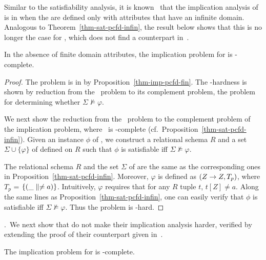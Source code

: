 Similar to the satisfiability analysis,
it is known~\cite{CFDs} that the implication analysis of
\CFDs is in \PTIME when the \CFDs are defined only with attributes that
have an infinite domain. Analogous to Theorem~\ref{thm-sat-pcfd-infin},
the result below shows that this is no longer the case for \pCFDs,
which does not find a counterpart in~\cite{CFDs}.

\begin{prop}
\label{thm-imp-pcfd-infin} In the absence of finite domain
attributes, the implication problem for \pCFDs is
\coNP-complete.
\end{prop}


\begin{proof}
The problem is in \coNP by
Proposition~\ref{thm-imp-pcfd-fin}. The \coNP-hardness is shown
by reduction from the \kSAT\ problem to its complement problem, \ie
the problem for determining whether $\Sigma\not\models\varphi$.


We next show the reduction from the \kSAT\ problem to the complement
problem of the implication problem, where \kSAT\ is \NP-complete
(cf.~Proposition~\ref{thm-sat-pcfd-infin}). Given an instance $\phi$
of \kSAT, we construct a relational schema $R$ and a set
$\Sigma\cup\{\varphi\}$ of \pCFDs defined on $R$ such that $\phi$
is satisfiable iff $\Sigma\not\models\varphi$.


The relational schema $R$ and the set $\Sigma$ of \pCFDs are the same
as the corresponding ones in Proposition~\ref{thm-sat-pcfd-infin}.
Moreover, $\varphi$ is defined as $(Z \rightarrow Z, T_p)$, where $T_{p}$ =
$\{(\_ \parallel \ne a)\}$. Intuitively, $\varphi$ requires that for any
$R$ tuple $t$, $t[Z] \ne a$. Along the same lines as
Proposition~\ref{thm-sat-pcfd-infin}, one can easily verify that
$\phi$ is satisfiable iff $\Sigma\not\models\varphi$. Thus the
problem is \coNP-hard.
\end{proof}




.~We next show that \pCINDs
do not make their implication analysis harder, verified by extending the proof of
their \CINDs counterpart given in~\cite{tcs-CINDs}.

\begin{prop}
\label{thm-imp-pcind-fin}The implication problem for \pCINDs is
\EXPTIME-complete.
\end{prop}



